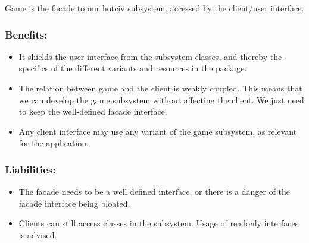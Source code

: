 Game is the facade to our hotciv subsystem, accessed by the client/user interface.

\subsubsection*{Benefits:}
\begin{itemize} \itemsep1pt \parskip0pt 
\item It shields the user interface from the subsystem classes, 
and thereby the specifics of the different variants and resources in the package.
\item The relation between game and the client is weakly coupled. This means that we can develop the game subsystem without affecting the client. We just need to keep the well-defined facade interface.
\item Any client interface may use any variant of the game subsystem, as relevant for the application.
\end{itemize}
\subsubsection*{Liabilities:}
\begin{itemize} \itemsep1pt \parskip0pt 
\item The facade needs to be a well defined interface, or there is a danger of the facade interface being bloated.
\item Clients can still access classes in the subsystem. Usage of readonly interfaces is advised.
\end{itemize}

\begin{comment}
The Game interface is then a model containing the game state, however do not notify the view, ui, when the game-state changes.

Its an adapter because it converts the interfaces of gameImpl into an interface the clients expects (the client being the ui or the customer specs).
(only gameImpl implements the adapter, so actually already conforms with client)
\end{comment}
